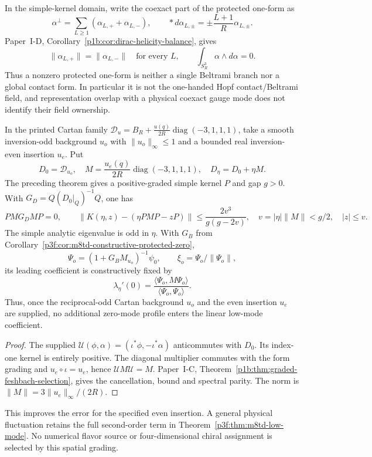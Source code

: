 \documentclass[11pt,a4paper]{article}
\begin{document}
\begin{remark}
\label{p3f:rem:m8td-helicity-balance}
In the simple-kernel domain, write the coexact part of the protected
one-form as
\[
 \alpha^\perp=\sum_{L\ge1}(\alpha_{L,+}+\alpha_{L,-}),\qquad
 *d\alpha_{L,\pm}=\pm\frac{L+1}{R}\alpha_{L,\pm}.
\]
Paper~I-D, Corollary~\ref{p1b:cor:dirac-helicity-balance}, gives
\begin{equation}
 \boxed{\|\alpha_{L,+}\|=\|\alpha_{L,-}\|\quad\text{for every }L,
 \qquad \int_{S_R^3}\alpha\wedge d\alpha=0.}
 \label{p3f:eq:m8td-helicity-balance}
\end{equation}
Thus a nonzero protected one-form is neither a single Beltrami branch nor
a global contact form. In particular it is not the one-handed Hopf
contact/Beltrami field, and representation overlap with a physical
coexact gauge mode does not identify their field ownership.
\end{remark}

\begin{corollary}
\label{p3f:cor:cartan-even-source-cubic-error}
In the printed Cartan family
\(\mathcal D_u=B_R+\frac{u(q)}{2R}\operatorname{diag}(-3,1,1,1)\),
take a smooth inversion-odd background \(u_o\) with
\(\|u_o\|_\infty\le1\) and a bounded real inversion-even insertion
\(u_e\). Put
\[
 D_0=\mathcal D_{u_o},\quad
 M=\frac{u_e(q)}{2R}\operatorname{diag}(-3,1,1,1),\quad
 D_\eta=D_0+\eta M .
\]
The preceding theorem gives a positive-graded simple kernel \(P\) and
gap \(g>0\). With \(G_D=Q(D_0|_Q)^{-1}Q\), one has
\[
 PMG_DMP=0,\qquad
 \|K(\eta,z)-(\eta PMP-zP)\|
 \le\frac{2v^3}{g(g-2v)},\quad
 v=|\eta|\|M\|<g/2,\quad |z|\le v.
\]
The simple analytic eigenvalue is odd in \(\eta\). With \(G_B\) from
Corollary~\ref{p3f:cor:m8td-constructive-protected-zero},
\[
 \Psi_o=(1+G_BM_{u_o})^{-1}\psi_0,\qquad
 \xi_o=\Psi_o/\|\Psi_o\|,
\]
its leading coefficient is constructively fixed by
\begin{equation}
 \boxed{\lambda_\eta'(0)=
 \frac{\langle\Psi_o,M\Psi_o\rangle}
 {\langle\Psi_o,\Psi_o\rangle}.}
 \label{p3f:eq:m8td-even-source-linear-coefficient}
\end{equation}
Thus, once the reciprocal-odd Cartan background \(u_o\) and the even
insertion \(u_e\) are supplied, no additional zero-mode profile enters
the linear low-mode coefficient.
\end{corollary}
\begin{proof}
The supplied \(\mathcal U(\phi,\alpha)
=(\iota^*\phi,-\iota^*\alpha)\) anticommutes with \(D_0\).
Its index-one kernel is entirely positive. The diagonal multiplier
commutes with the form grading and \(u_e\circ\iota=u_e\), hence
\(\mathcal UM\mathcal U=M\). Paper~I-C,
Theorem~\ref{p1b:thm:graded-feshbach-selection}, gives the cancellation,
bound and spectral parity. The norm is
\(\|M\|=3\|u_e\|_\infty/(2R)\).
\end{proof}
This improves the error for the specified even insertion. A general
physical fluctuation retains the full second-order term in
Theorem~\ref{p3f:thm:m8td-low-mode}. No numerical flavor source or
four-dimensional chiral assignment is selected by this spatial grading.
\end{document}

